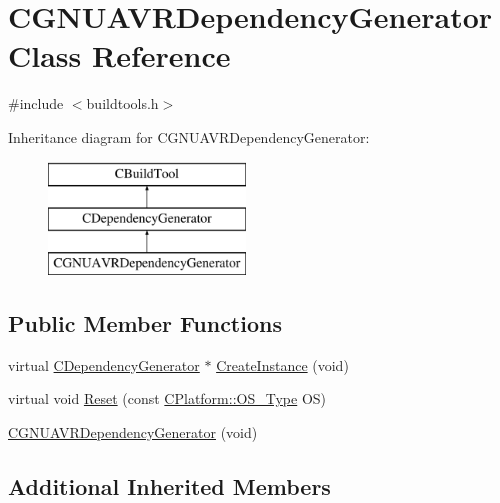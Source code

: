 \hypertarget{classCGNUAVRDependencyGenerator}{\section{C\-G\-N\-U\-A\-V\-R\-Dependency\-Generator Class Reference}
\label{classCGNUAVRDependencyGenerator}
}


{\ttfamily \#include $<$buildtools.\-h$>$}

Inheritance diagram for C\-G\-N\-U\-A\-V\-R\-Dependency\-Generator\-:\begin{figure}[H]
\begin{center}
\leavevmode
\includegraphics[height=3.000000cm]{d6/d35/classCGNUAVRDependencyGenerator}
\end{center}
\end{figure}
\subsection*{Public Member Functions}
\begin{DoxyCompactItemize}
\item 
virtual \hyperlink{classCDependencyGenerator}{C\-Dependency\-Generator} $\ast$ \hyperlink{classCGNUAVRDependencyGenerator_a5d4d5e45d1cdd58d998ac961a66647dc}{Create\-Instance} (void)
\item 
virtual void \hyperlink{classCGNUAVRDependencyGenerator_af96f3eb85393be62b8b91f0376b17273}{Reset} (const \hyperlink{classCPlatform_a2fb735c63c53052f79629e338bb0f535}{C\-Platform\-::\-O\-S\-\_\-\-Type} O\-S)
\item 
\hyperlink{classCGNUAVRDependencyGenerator_ae21ae7f52c6f2ac00754297adf953e27}{C\-G\-N\-U\-A\-V\-R\-Dependency\-Generator} (void)
\end{DoxyCompactItemize}
\subsection*{Additional Inherited Members}


